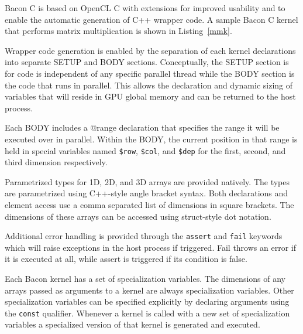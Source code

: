 \documentclass{llncs}
\begin{document}
Bacon C is based on OpenCL C with extensions for improved usability
and to enable the automatic generation of C++ wrapper code. A sample
Bacon C kernel that performs matrix multiplication is shown in
Listing~\ref{mmk}.

Wrapper code generation is enabled by the separation of each kernel
declarations into separate SETUP and BODY sections. Conceptually, the
SETUP section is for code is independent of any specific parallel
thread while the BODY section is the code that runs in parallel. This
allows the declaration and dynamic sizing of variables that will
reside in GPU global memory and can be returned to the host process.

Each BODY includes a @range declaration that specifies the range it
will be executed over in parallel. Within the BODY, the current
position in that range is held in special variables named {\tt\$row},
{\tt\$col}, and {\tt\$dep} for the first, second, and third dimension
respectively.

Parametrized types for 1D, 2D, and 3D arrays are provided
natively. The types are parametrized using C++-style angle bracket
syntax. Both declarations and element access use a comma separated
list of dimensions in square brackets. The dimensions of these arrays
can be accessed using struct-style dot notation.

Additional error handling is provided through the {\tt assert} and
{\tt fail} keywords which will raise exceptions in the host process if
triggered. Fail throws an error if it is executed at all, while assert
is triggered if its condition is false.

Each Bacon kernel has a set of specialization variables. The
dimensions of any arrays passed as arguments to a kernel are always
specialization variables. Other specialization variables can be
specified explicitly by declaring arguments using the {\tt const}
qualifier. Whenever a kernel is called with a new set of
specialization variables a specialized version of that kernel is
generated and executed.
\end{document}
